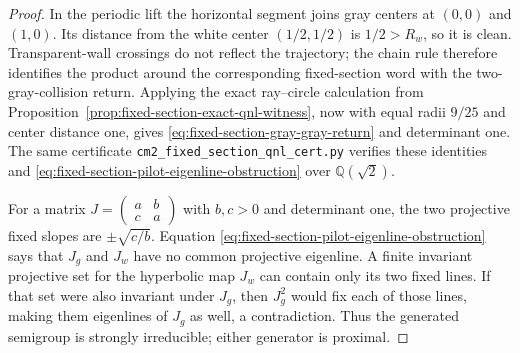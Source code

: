 \documentclass[11pt]{article}
\begin{document}
\begin{proof}
In the periodic lift the horizontal segment joins gray centers at $(0,0)$
and $(1,0)$.  Its distance from the white center $(1/2,1/2)$ is $1/2>R_w$,
so it is clean.  Transparent-wall crossings do not reflect the trajectory;
the chain rule therefore identifies the product around the corresponding
fixed-section word with the two-gray-collision return.  Applying the exact
ray--circle calculation from
Proposition~\ref{prop:fixed-section-exact-qnl-witness}, now with equal radii
$9/25$ and center distance one, gives
\eqref{eq:fixed-section-gray-gray-return} and determinant one.  The same
certificate \texttt{cm2\_fixed\_section\_qnl\_cert.py} verifies these
identities and \eqref{eq:fixed-section-pilot-eigenline-obstruction} over
$\mathbb Q(\sqrt2)$.

For a matrix
$J=\left(\begin{smallmatrix}a&b\\c&a\end{smallmatrix}\right)$ with
$b,c>0$ and determinant one, the two projective fixed slopes are
$\pm\sqrt{c/b}$.  Equation
\eqref{eq:fixed-section-pilot-eigenline-obstruction} says that $J_g$ and
$J_w$ have no common projective eigenline.  A finite invariant projective
set for the hyperbolic map $J_w$ can contain only its two fixed lines.  If
that set were also invariant under $J_g$, then $J_g^2$ would fix each of
those lines, making them eigenlines of $J_g$ as well, a contradiction.
Thus the generated semigroup is strongly irreducible; either generator is
proximal.
\end{proof}
\end{document}
